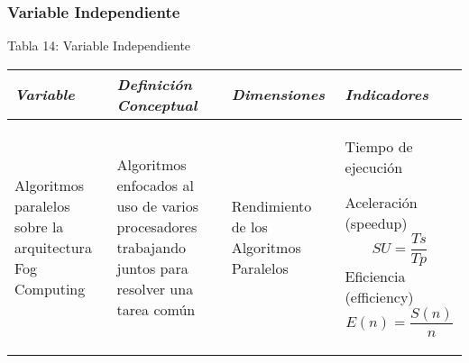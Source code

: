         \subsubsection{Variable Independiente}
            \begin{table}[h!]
                \centering
                { Tabla 14: Variable Independiente}\par
                \begin{tabular}{|p{3cm}|p{3cm}|p{3cm}|p{3cm}|} \hline
                    
                
                \textit{{\bf{Variable}}} &
                \textit{{\bf{Definición Conceptual}}} &
                \textit{{\bf{Dimensiones}}} &
                \textit{{\bf{Indicadores}}}
                \\ \hline

                Algoritmos paralelos sobre la arquitectura Fog Computing &
                Algoritmos enfocados al uso de varios procesadores trabajando juntos para resolver una tarea común &
                Rendimiento de los Algoritmos Paralelos &
                Tiempo de ejecución \par
                Aceleración (speedup) 
                \begin{equation*}\label{}
                    SU = \frac{Ts}{Tp}
                \end{equation*}   
                Eficiencia (efficiency) 
                \begin{equation*}\label{}
                    E(n) = \frac{S(n)}{n}
                \end{equation*}                

                \\ \hline

                \end{tabular}
            \end{table}
